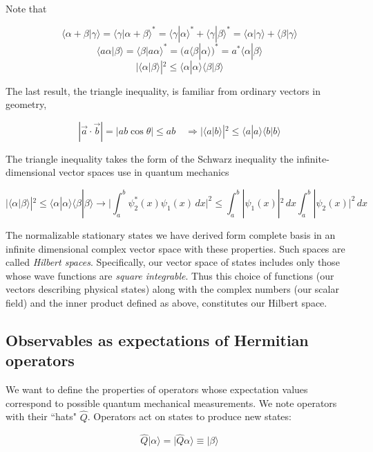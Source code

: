 Note that 

\[ \langle \alpha + \beta | \gamma \rangle = \langle \gamma | \alpha + \beta
  \rangle^* = \langle\gamma | \alpha\rangle^* + \langle \gamma | \beta\rangle^*
= \langle \alpha | \gamma \rangle + \langle \beta | \gamma \rangle \] 
\[ \langle a \alpha | \beta \rangle = \langle \beta | a \alpha \rangle^* = (a
\langle \beta | \alpha \rangle)^* = a^* \langle \alpha | \beta\rangle \] 
\[ | \langle \alpha | \beta \rangle | ^2 \leq \langle \alpha | \alpha \rangle
\langle \beta | \beta \rangle \]


The last result, the triangle inequality, is familiar from ordinary vectors in
geometry, 

\[
|\vec{a} \cdot \vec{b}| = |ab \cos \theta| \leq ab \quad \Rightarrow | \langle
a | b\rangle | ^2 \leq \langle a | a \rangle \langle  b | b \rangle
\] \vspace{3px}

The triangle inequality takes the form of the Schwarz inequality the
infinite-dimensional vector spaces use in quantum mechanics 

\[
|\langle \alpha | \beta \rangle |^2 \leq \langle \alpha | \alpha \rangle
\langle \beta | \beta \rangle \rightarrow \Bigg| \int_{a}^{b} \psi_2^*(x)
\psi_1(x)  \, dx \Bigg|^2 \leq \int_{a}^{b} |\psi_1(x)|^2 \, dx \int_{a}^{b}
|\psi_2(x)|^2 \, dx
\] \vspace{3px}


The normalizable stationary states we have derived form complete basis in an
infinite dimensional complex vector space with these properties. Such spaces
are called \textit{Hilbert spaces}. Specifically, our vector space of states
includes only those whose wave functions are \textit{square integrable}. Thus
this choice of functions (our vectors describing physical states) along with
the complex numbers (our scalar field) and the inner product defined as above,
constitutes our Hilbert space. 


\subsection{Observables as expectations of Hermitian operators}

We want to define the properties of operators whose expectation values
correspond to possible quantum mechanical measurements. We note operators with
their ``hats" $\hat{Q}$. Operators act on states to produce new states: 

\[
\hat{Q}| \alpha \rangle = | \hat{Q} \alpha \rangle \equiv | \beta \rangle
\] \vspace{3px}

